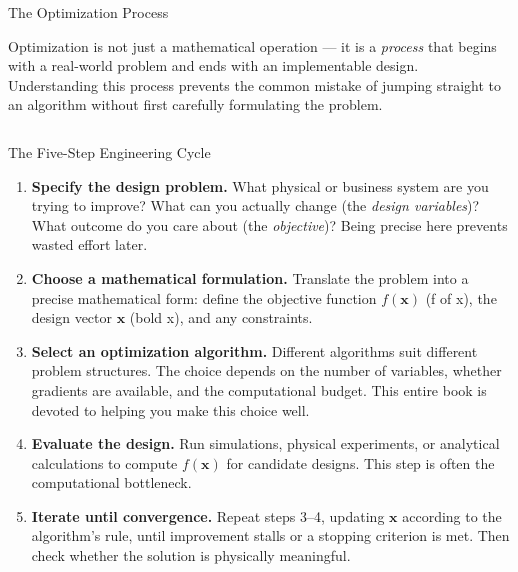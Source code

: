 \documentclass[aspectratio=169,10pt]{beamer}
\newcommand{\vx}{\mathbf{x}}
\begin{document}
\begin{frame}[allowframebreaks]{The Optimization Process}

Optimization is not just a mathematical operation --- it is a \emph{process}
that begins with a real-world problem and ends with an implementable design.
Understanding this process prevents the common mistake of jumping straight to
an algorithm without first carefully formulating the problem.

  \begin{columns}[T]
      \begin{block}{The Five-Step Engineering Cycle}
        \begin{enumerate}
          \item \textbf{Specify the design problem.}  What physical or business
            system are you trying to improve?  What can you actually change
            (the \emph{design variables})?  What outcome do you care about
            (the \emph{objective})?  Being precise here prevents wasted effort later.

          \item \textbf{Choose a mathematical formulation.}  Translate the
            problem into a precise mathematical form: define the objective
            function $f(\vx)$ (f of x), the design vector $\vx$ (bold x), and any constraints.

          \item \textbf{Select an optimization algorithm.}  Different algorithms
            suit different problem structures.  The choice depends on the number
            of variables, whether gradients are available, and the computational
            budget.  This entire book is devoted to helping you make this choice well.

          \item \textbf{Evaluate the design.}  Run simulations, physical
            experiments, or analytical calculations to compute $f(\vx)$ for
            candidate designs.  This step is often the computational bottleneck.

          \item \textbf{Iterate until convergence.}  Repeat steps 3--4,
            updating $\vx$ according to the algorithm's rule, until improvement
            stalls or a stopping criterion is met.  Then check whether the
            solution is physically meaningful.
        \end{enumerate}
      \end{block}


\end{columns}
\end{frame}
\end{document}
